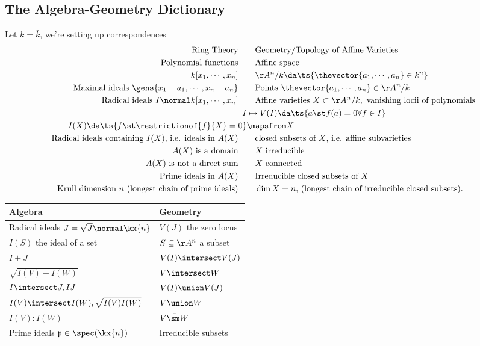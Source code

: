 \hypertarget{the-algebra-geometry-dictionary}{%
\subsection{The Algebra-Geometry
Dictionary}\label{the-algebra-geometry-dictionary}}

Let \(k=\bar k\), we're setting up correspondences
\begin{align*}  
\text{Ring Theory} 
\quad&\quad 
\text{Geometry/Topology of Affine Varieties}
\\
\text{Polynomial functions} 
\quad&\quad 
\text{Affine space} 
\\
k[x_1, \cdots, x_n]
\quad&\quad 
\AA^n/k \da \ts{\thevector{a_1, \cdots, a_n} \in k^n } 
\\
\text{Maximal ideals } \gens{x_1 - a_1, \cdots, x_n - a_n} 
\quad&\quad 
\text{Points } \thevector{a_1, \cdots, a_n} \in \AA^n/k
\\
\text{Radical ideals } I\normal k[x_1, \cdots, x_n]
\quad&\quad 
\text{Affine varieties } X\subset  \AA^n/k, \text{ vanishing locii of polynomials} 
\\
I &\mapsto V(I) \da \ts{a\st f(a) = 0 \forall f\in I} \\
I(X) \da \ts{f \st \restrictionof{f}{X} = 0} &\mapsfrom X 
\\
\text{Radical ideals containing $I(X)$, i.e. ideals in $A(X)$} 
\quad&\quad 
\text{closed subsets of $X$, i.e. affine subvarieties}
\\
A(X) \text{ is a domain}
\quad&\quad 
\text{$X$ irreducible}
\\
\text{$A(X)$ is not a direct sum}
\quad&\quad 
\text{$X$ connected} 
\\
\text{Prime ideals in }A(X)
\quad&\quad 
\text{Irreducible closed subsets of }X
\\
\text{Krull dimension $n$ (longest chain of prime ideals)}
\quad&\quad 
\dim X = n,\, \text{(longest chain of irreducible closed subsets)}
.\end{align*}

\begin{longtable}[]{@{}ll@{}}
\toprule
Algebra & Geometry\tabularnewline
\midrule
\endhead
Radical ideals \(J = \sqrt{J} \normal \kx{n}\) & \(V(J)\) the zero
locus\tabularnewline
\(I(S)\) the ideal of a set & \(S \subseteq \AA^n\) a
subset\tabularnewline
\(I + J\) & \(V(I) \intersect V(J)\)\tabularnewline
\(\sqrt{I(V) + I(W)}\) & \(V\intersect W\)\tabularnewline
\(I \intersect J, IJ\) & \(V(I) \union V(J)\)\tabularnewline
\(I(V) \intersect I(W), \sqrt{I(V)I(W)}\) &
\(V \union W\)\tabularnewline
\(I(V) : I(W)\) & \(\bar{V\sm W}\)\tabularnewline
Prime ideals \(\mathfrak{p}\in \spec(\kx{n})\) & Irreducible
subsets\tabularnewline
\bottomrule
\end{longtable}

